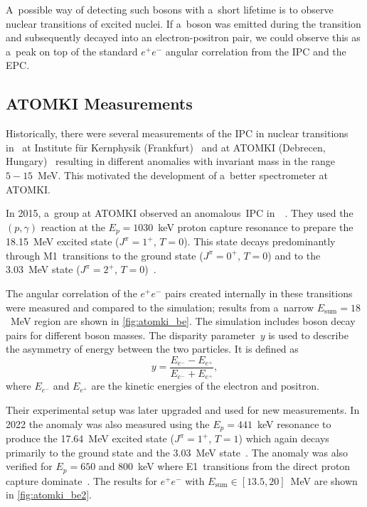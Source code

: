 		A~possible way of detecting such bosons with a~short lifetime is to observe nuclear transitions of excited nuclei. If a~boson was emitted during the transition and subsequently decayed into an electron\nobreakdash-positron pair, we could observe this as a~peak on top of the standard $e^+e^-$ angular correlation from the \acf{IPC} and the \acf{EPC}.
	
		\subsection{ATOMKI Measurements}
			Historically, there were several measurements of the \ac{IPC} in nuclear transitions in~ at Institute für Kernphysik (Frankfurt)~\cite{ikf1996,ikf1997,ikf2001} and at ATOMKI (Debrecen, Hungary)~\cite{atomki2008,atomki2012} resulting in different anomalies with invariant mass in the range $5-15$~MeV. This motivated the development of a~better spectrometer at ATOMKI.
		
			In 2015, a~group at ATOMKI observed an anomalous~\ac{IPC} in~~\cite{atomki_be}. They used the $(p,\gamma)$ reaction at the $E_p = 1030$~keV proton capture resonance to prepare the 18.15~MeV excited state ($J^\pi = 1^{+}$, $T=0$). This state decays predominantly through M1~transitions to the ground state ($J^\pi = 0^{+}$, $T=0$) and to the 3.03~MeV state ($J^\pi = 2^{+}$, $T=0$)~\cite{resonances}.
			
			The angular correlation of the $e^+ e^-$ pairs created internally in these transitions were measured and compared to the simulation; results from a~narrow $E_\text{sum}=18$~MeV region are shown in \cref{fig:atomki_be}. The simulation includes boson decay pairs for different boson masses. The disparity parameter~$y$ is used to describe the asymmetry of energy between the two particles. It is defined as
				\begin{equation}
					\label{eq:dispar}
					y = \frac{E_{e^-}-E_{e^+}}{E_{e^-}+E_{e^+}},
				\end{equation}
			where $E_{e^-}$ and $E_{e^+}$ are the kinetic energies of the electron and positron.
			
			Their experimental setup was later upgraded and used for new measurements. In 2022 the  anomaly was also measured using the $E_p = 441$~keV resonance to produce the 17.64~MeV excited state ($J^\pi = 1^{+}$, $T=1$) which again decays primarily to the ground state and the 3.03~MeV state~\cite{resonances}. The anomaly was also verified for $E_p = 650$ and 800~keV where E1~transitions from the direct proton capture dominate~\cite{atomki_be2}. The results for $e^+e^-$ with ${E_\text{sum}\in[13.5,20]}$~MeV are shown in \cref{fig:atomki_be2}.
			
